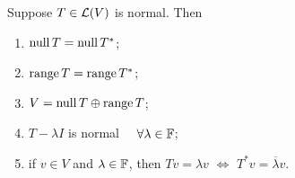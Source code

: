 \begin{thm}
  \label{thm: range, null space, and eigenvectors of a normal operator}
  Suppose $T\in \mathcal{L}(V)$ is normal. Then
  \begin{enumerate}[label=\textbf{(\alph*)}]
    \item $\operatorname{null} T = \operatorname{null} T^*$;
    \item $\operatorname{range} T = \operatorname{range} T^*$;
    \item $V = \operatorname{null} T  \oplus \operatorname{range} T$;
    \item $T - \lambda I$ is normal $\quad \forall \lambda \in \mathbb{F}$;
    \item if $v \in V$ and $\lambda \in \mathbb{F}$, then $Tv = \lambda v$ $\iff$ $T^*v = \overline{\lambda} v$.
  \end{enumerate}
\end{thm}
